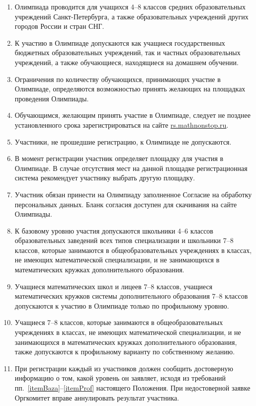 \documentclass[a4paper,12pt]{article}
\newcommand{\surl}[1]{{\small\url{#1}}}
\begin{document}
\begin{enumerate}
	\item Олимпиада проводится для учащихся 4–8 классов средних образовательных учреждений Санкт-Петербурга, а также образовательных учреждений других городов России и стран СНГ.
	\item К участию в Олимпиаде допускаются как учащиеся государственных бюджетных образовательных учреждений, так и частных образовательных учреждений, а также обучающиеся, находящиеся на домашнем обучении.
	\item Ограничения по количеству обучающихся, принимающих участие в Олимпиаде, определяются возможностью принять желающих на площадках проведения Олимпиады.
	\item Обучающимся, желающим принять участие в Олимпиаде, следует не позднее установленного срока зарегистрироваться на сайте \surl{rs.mathnonstop.ru}.
	\item Участники, не прошедшие регистрацию, к Олимпиаде не допускаются.
	\item В момент регистрации участник определяет площадку для участия в Олимпиаде. В случае отсутствия мест на данной площадке регистрационная система рекомендует участнику выбрать другую площадку.
	\item Участник обязан принести на Олимпиаду заполненное Согласие на обработку персональных данных. Бланк согласия доступен для скачивания на сайте Олимпиады.
	\item \label{itemBaza}
	   К базовому уровню участия допускаются школьники 4–6 классов
	   образовательных заведений всех типов специализации и
	   школьники 7–8 классов, которые занимаются в общеобразовательных
	   учреждениях в классах, не имеющих математической специализации,
	   и не занимающихся в математических кружках дополнительного образования.
	\item Учащиеся математических школ и лицеев 7–8 классов,
	   учащиеся математических кружков системы дополнительного образования
	   7–8 классов допускаются к участию в Олимпиаде
	   только по профильному уровню.
	\item \label{itemProf}
	   Учащиеся 7–8 классов, которые занимаются в общеобразовательных
	   учреждениях в классах, не имеющих математической специализации,
	   и не занимающихся в математических кружках дополнительного образования,
	   также допускаются к профильному варианту по собственному желанию.
	\item При регистрации каждый из участников должен сообщить
	   достоверную информацию о том, какой уровень он заявляет, исходя из
	   требований пп.~\ref{itemBaza}–\ref{itemProf} настоящего Положения.
	   При недостоверной заявке Оргкомитет вправе аннулировать
	   результат участника.
\end{enumerate}
\end{document}
